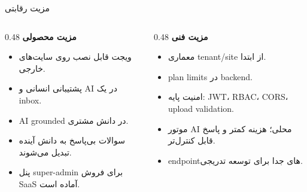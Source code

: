 \documentclass[aspectratio=169,12pt]{beamer}
\begin{document}
\begin{frame}{مزیت رقابتی}
  \begin{columns}[T,totalwidth=\textwidth]
    \begin{column}{0.48\textwidth}
      \textbf{مزیت محصولی}
      \begin{itemize}
        \item ویجت قابل نصب روی سایت‌های خارجی.
        \item پشتیبانی انسانی و AI در یک inbox.
        \item AI grounded در دانش مشتری.
        \item سوالات بی‌پاسخ به دانش آینده تبدیل می‌شوند.
        \item پنل super-admin برای فروش SaaS آماده است.
      \end{itemize}
    \end{column}
    \begin{column}{0.48\textwidth}
      \textbf{مزیت فنی}
      \begin{itemize}
        \item معماری tenant/site از ابتدا.
        \item plan limits در backend.
        \item امنیت پایه: JWT، RBAC، CORS، upload validation.
        \item موتور AI محلی؛ هزینه کمتر و پاسخ قابل کنترل‌تر.
        \item endpointهای جدا برای توسعه تدریجی.
      \end{itemize}
    \end{column}
  \end{columns}
\end{frame}
\end{document}
